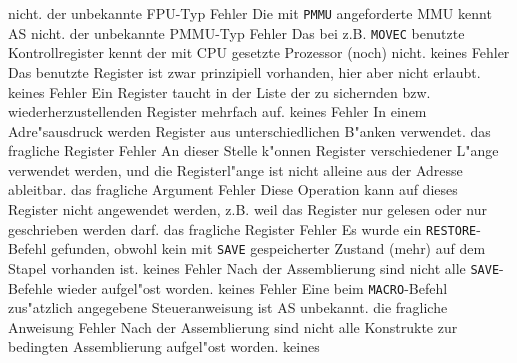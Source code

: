 \documentclass[12pt,a4paper,twoside]{report}
\newcommand{\tty}[1]{{\tt #1}}
\begin{document}
\begin{description}
{                nicht.}
               {der unbekannte FPU-Typ}
               {Fehler}
               {Die mit \tty{PMMU} angeforderte MMU kennt AS nicht.}
               {der unbekannte PMMU-Typ}
               {Fehler}
               {Das bei z.B. \tty{MOVEC} benutzte
	        Kontrollregister  kennt der mit CPU gesetzte Prozessor
	        (noch) nicht.}
               {keines}
               {Fehler}
               {Das benutzte Register ist zwar prinzipiell
                vorhanden, hier aber nicht erlaubt.}
               {keines}
               {Fehler}
               {Ein Register taucht in der Liste der zu sichernden bzw.
                wiederherzustellenden Register mehrfach auf.}
               {keines}
               {Fehler}
               {In einem Adre"sausdruck werden Register aus unterschiedlichen
                B"anken verwendet.}
               {das fragliche Register}
               {Fehler}
               {An dieser Stelle k"onnen Register verschiedener L"ange verwendet werden,
                und die Registerl"ange ist nicht alleine aus der Adresse ableitbar.}
               {das fragliche Argument}
               {Fehler}
               {Diese Operation kann auf dieses Register nicht angewendet werden, z.B.
                weil das Register nur gelesen oder nur geschrieben werden darf.}
               {das fragliche Register}
               {Fehler}
               {Es wurde ein \tty{RESTORE}-Befehl gefunden, obwohl
                kein mit \tty{SAVE} gespeicherter Zustand (mehr) auf dem Stapel
                vorhanden ist.}
               {keines}
               {Fehler}
               {Nach der Assemblierung sind nicht alle
                \tty{SAVE}-Befehle wieder aufgel"ost worden.}
               {keines}
               {Fehler}
               {Eine beim \tty{MACRO}-Befehl zus"atzlich angegebene
                Steueranweisung ist AS unbekannt.}
               {die fragliche Anweisung}
               {Fehler}
               {Nach der Assemblierung sind nicht alle
                Konstrukte zur bedingten Assemblierung aufgel"ost
                worden.}
               {keines}

\end{description}
\end{document}
